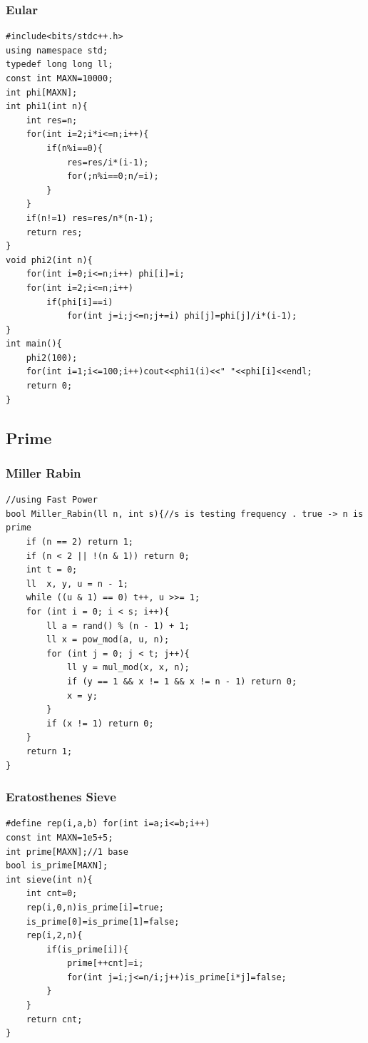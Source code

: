 \documentclass[twoside]{article}
\begin{document}
\subsubsection{Eular}
\begin{lstlisting}
#include<bits/stdc++.h>
using namespace std;
typedef long long ll;
const int MAXN=10000;
int phi[MAXN];
int phi1(int n){
    int res=n;
    for(int i=2;i*i<=n;i++){
        if(n%i==0){
            res=res/i*(i-1);
            for(;n%i==0;n/=i);
        }
    }
    if(n!=1) res=res/n*(n-1);
    return res;
}
void phi2(int n){
    for(int i=0;i<=n;i++) phi[i]=i;
    for(int i=2;i<=n;i++)
        if(phi[i]==i)
            for(int j=i;j<=n;j+=i) phi[j]=phi[j]/i*(i-1);
}
int main(){
    phi2(100);
    for(int i=1;i<=100;i++)cout<<phi1(i)<<" "<<phi[i]<<endl;
    return 0;
}
\end{lstlisting}
\subsection{Prime}
\subsubsection{Miller Rabin}
\begin{lstlisting}
//using Fast Power	
bool Miller_Rabin(ll n, int s){//s is testing frequency . true -> n is prime 	
    if (n == 2) return 1;	
    if (n < 2 || !(n & 1)) return 0;	
    int t = 0;	
    ll  x, y, u = n - 1;	
    while ((u & 1) == 0) t++, u >>= 1;	
    for (int i = 0; i < s; i++){	
        ll a = rand() % (n - 1) + 1;	
        ll x = pow_mod(a, u, n);	
        for (int j = 0; j < t; j++){	
            ll y = mul_mod(x, x, n);	
            if (y == 1 && x != 1 && x != n - 1) return 0;	
            x = y;	
        }	
        if (x != 1) return 0;	
    }	
    return 1;	
}
\end{lstlisting}
\subsubsection{Eratosthenes Sieve}
\begin{lstlisting}
#define rep(i,a,b) for(int i=a;i<=b;i++)
const int MAXN=1e5+5;
int prime[MAXN];//1 base
bool is_prime[MAXN];
int sieve(int n){
    int cnt=0;
    rep(i,0,n)is_prime[i]=true;
    is_prime[0]=is_prime[1]=false;
    rep(i,2,n){
        if(is_prime[i]){
            prime[++cnt]=i;
            for(int j=i;j<=n/i;j++)is_prime[i*j]=false;
        }
    }
    return cnt;
}

\end{lstlisting}
\end{document}
